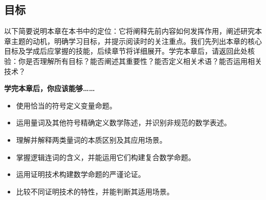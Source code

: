 \subsection{目标}

以下简要说明本章在本书中的定位：它将阐释先前内容如何发挥作用，阐述研究本章主题的动机，明确学习目标，并提示阅读时的关注重点。我们先列出本章的核心目标及学成后应掌握的技能，后续章节将详细展开。学完本章后，请返回此处核验：你是否理解所有目标？能否阐述其重要性？能否定义相关术语？能否运用相关技术？

\textbf{学完本章后，你应该能够……}

\begin{itemize}
    \item 使用恰当的符号定义变量命题。
    \item 运用量词及其他符号精确定义数学陈述，并识别非规范的数学表述。
    \item 理解并解释两类量词的本质区别及其应用场景。
    \item 掌握逻辑连词的含义，并能运用它们构建复合数学命题。
    \item 运用证明技术构建数学命题的严谨论证。
    \item 比较不同证明技术的特性，并能判断其适用场景。
\end{itemize}

